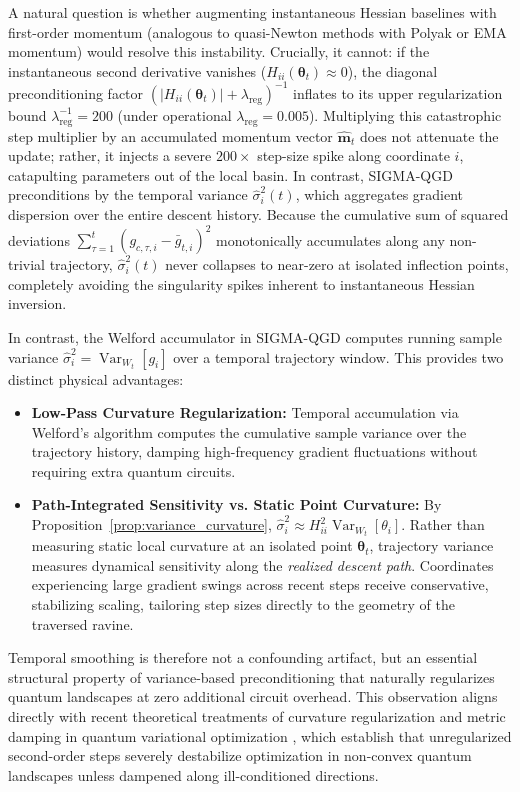 \documentclass[11pt,a4paper]{article}
\begin{document}
A natural question is whether augmenting instantaneous Hessian baselines with first-order momentum (analogous to quasi-Newton methods with Polyak or EMA momentum) would resolve this instability. Crucially, it cannot: if the instantaneous second derivative vanishes ($H_{ii}(\boldsymbol{\theta}_t) \approx 0$), the diagonal preconditioning factor $(|H_{ii}(\boldsymbol{\theta}_t)| + \lambda_{\text{reg}})^{-1}$ inflates to its upper regularization bound $\lambda_{\text{reg}}^{-1} = 200$ (under operational $\lambda_{\text{reg}} = 0.005$). Multiplying this catastrophic step multiplier by an accumulated momentum vector $\hat{\mathbf{m}}_t$ does not attenuate the update; rather, it injects a severe $200\times$ step-size spike along coordinate $i$, catapulting parameters out of the local basin. In contrast, SIGMA-QGD preconditions by the temporal variance $\hat{\sigma}_i^2(t)$, which aggregates gradient dispersion over the entire descent history. Because the cumulative sum of squared deviations $\sum_{\tau=1}^t (g_{c,\tau,i} - \bar{g}_{t,i})^2$ monotonically accumulates along any non-trivial trajectory, $\hat{\sigma}_i^2(t)$ never collapses to near-zero at isolated inflection points, completely avoiding the singularity spikes inherent to instantaneous Hessian inversion.

In contrast, the Welford accumulator in SIGMA-QGD computes running sample variance $\hat{\sigma}_i^2 = \operatorname{Var}_{W_t}[g_i]$ over a temporal trajectory window. This provides two distinct physical advantages:
\begin{itemize}
    \item \textbf{Low-Pass Curvature Regularization:} Temporal accumulation via Welford's algorithm computes the cumulative sample variance over the trajectory history, damping high-frequency gradient fluctuations without requiring extra quantum circuits.
    \item \textbf{Path-Integrated Sensitivity vs. Static Point Curvature:} By Proposition~\ref{prop:variance_curvature}, $\hat{\sigma}_i^2 \approx H_{ii}^2 \operatorname{Var}_{W_t}[\theta_i]$. Rather than measuring static local curvature at an isolated point $\boldsymbol{\theta}_t$, trajectory variance measures dynamical sensitivity along the \emph{realized descent path}. Coordinates experiencing large gradient swings across recent steps receive conservative, stabilizing scaling, tailoring step sizes directly to the geometry of the traversed ravine.
\end{itemize}
Temporal smoothing is therefore not a confounding artifact, but an essential structural property of variance-based preconditioning that naturally regularizes quantum landscapes at zero additional circuit overhead. This observation aligns directly with recent theoretical treatments of curvature regularization and metric damping in quantum variational optimization \cite{stokes2020quantum,wierichs2020avoiding}, which establish that unregularized second-order steps severely destabilize optimization in non-convex quantum landscapes unless dampened along ill-conditioned directions.
\end{document}
